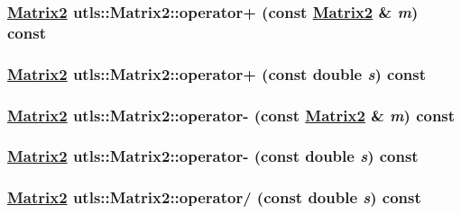 \hypertarget{classutls_1_1Matrix2_c39eaaaf35ade5397568dc2c65c2d13a}{
\subsubsection[operator+]{\setlength{\rightskip}{0pt plus 5cm}\hyperlink{classutls_1_1Matrix2}{Matrix2} utls::Matrix2::operator+ (const \hyperlink{classutls_1_1Matrix2}{Matrix2} \& {\em m}) const}}
\label{classutls_1_1Matrix2_c39eaaaf35ade5397568dc2c65c2d13a}


\hypertarget{classutls_1_1Matrix2_bea714bdf616c0b90db7f91a4f3147f8}{
\subsubsection[operator+]{\setlength{\rightskip}{0pt plus 5cm}\hyperlink{classutls_1_1Matrix2}{Matrix2} utls::Matrix2::operator+ (const double {\em s}) const}}
\label{classutls_1_1Matrix2_bea714bdf616c0b90db7f91a4f3147f8}


\hypertarget{classutls_1_1Matrix2_c3d36f396103f77bcf0063212c0a7e83}{
\subsubsection[operator-]{\setlength{\rightskip}{0pt plus 5cm}\hyperlink{classutls_1_1Matrix2}{Matrix2} utls::Matrix2::operator- (const \hyperlink{classutls_1_1Matrix2}{Matrix2} \& {\em m}) const}}
\label{classutls_1_1Matrix2_c3d36f396103f77bcf0063212c0a7e83}


\hypertarget{classutls_1_1Matrix2_3de00b53dd1dfabde9d8fb2b4c05dfa0}{
\subsubsection[operator-]{\setlength{\rightskip}{0pt plus 5cm}\hyperlink{classutls_1_1Matrix2}{Matrix2} utls::Matrix2::operator- (const double {\em s}) const}}
\label{classutls_1_1Matrix2_3de00b53dd1dfabde9d8fb2b4c05dfa0}


\hypertarget{classutls_1_1Matrix2_d937e6eeb0243c1760e65c63bedd00e0}{
\subsubsection[operator/]{\setlength{\rightskip}{0pt plus 5cm}\hyperlink{classutls_1_1Matrix2}{Matrix2} utls::Matrix2::operator/ (const double {\em s}) const}}
\label{classutls_1_1Matrix2_d937e6eeb0243c1760e65c63bedd00e0}


